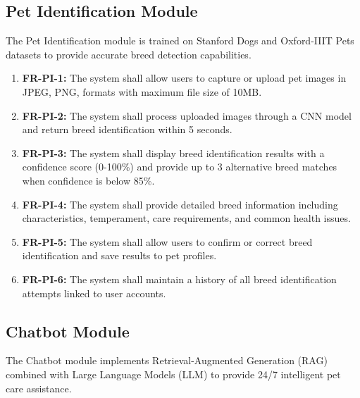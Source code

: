 \subsection{Pet Identification Module}
The Pet Identification module is trained on Stanford Dogs and Oxford-IIIT Pets datasets to provide accurate breed detection capabilities.

\begin{enumerate}
    \item \textbf{FR-PI-1:} The system shall allow users to capture or upload pet images in JPEG, PNG, formats with maximum file size of 10MB.
    \item \textbf{FR-PI-2:} The system shall process uploaded images through a CNN model and return breed identification within 5 seconds.
    \item \textbf{FR-PI-3:} The system shall display breed identification results with a confidence score (0-100\%) and provide up to 3 alternative breed matches when confidence is below 85\%.
    \item \textbf{FR-PI-4:} The system shall provide detailed breed information including characteristics, temperament, care requirements, and common health issues.
    \item \textbf{FR-PI-5:} The system shall allow users to confirm or correct breed identification and save results to pet profiles.
    \item \textbf{FR-PI-6:} The system shall maintain a history of all breed identification attempts linked to user accounts.
\end{enumerate}

\subsection{Chatbot Module}
The Chatbot module implements Retrieval-Augmented Generation (RAG) combined with Large Language Models (LLM) to provide 24/7 intelligent pet care assistance.

